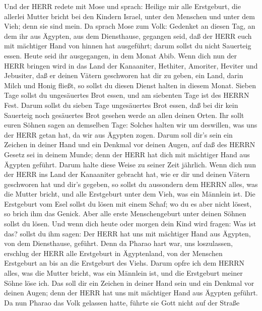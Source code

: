  Und der HERR redete mit Mose und sprach: 
Heilige mir alle Erstgeburt, die allerlei Mutter bricht bei den Kindern
Israel, unter den Menschen und unter dem Vieh; denn sie sind mein.
 Da sprach Mose zum Volk: Gedenket an diesen Tag, an dem ihr
aus Ägypten, aus dem Diensthause, gegangen seid, daß der HERR euch mit
mächtiger Hand von hinnen hat ausgeführt; darum sollst du nicht
Sauerteig essen.  Heute seid ihr ausgegangen, in dem Monat
Abib.  Wenn dich nun der HERR bringen wird in das Land der
Kanaaniter, Hethiter, Amoriter, Heviter und Jebusiter, daß er deinen
Vätern geschworen hat dir zu geben, ein Land, darin Milch und Honig
fließt, so sollst du diesen Dienst halten in diesem Monat. 
Sieben Tage sollst du ungesäuertes Brot essen, und am siebenten Tage ist
des HERRN Fest.  Darum sollst du sieben Tage ungesäuertes
Brot essen, daß bei dir kein Sauerteig noch gesäuertes Brot gesehen
werde an allen deinen Orten.  Ihr sollt euren Söhnen sagen
an demselben Tage: Solches halten wir um deswillen, was uns der HERR
getan hat, da wir aus Ägypten zogen.  Darum soll dir's sein
ein Zeichen in deiner Hand und ein Denkmal vor deinen Augen, auf daß des
HERRN Gesetz sei in deinem Munde; denn der HERR hat dich mit mächtiger
Hand aus Ägypten geführt.  Darum halte diese Weise zu
seiner Zeit jährlich.  Wenn dich nun der HERR ins Land der
Kanaaniter gebracht hat, wie er dir und deinen Vätern geschworen hat und
dir's gegeben,  so sollst du aussondern dem HERRN alles,
was die Mutter bricht, und alle Erstgeburt unter dem Vieh, was ein
Männlein ist.  Die Erstgeburt vom Esel sollst du lösen mit
einem Schaf; wo du es aber nicht lösest, so brich ihm das Genick. Aber
alle erste Menschengeburt unter deinen Söhnen sollst du lösen.
 Und wenn dich heute oder morgen dein Kind wird fragen: Was
ist das? sollst du ihm sagen: Der HERR hat uns mit mächtiger Hand aus
Ägypten, von dem Diensthause, geführt.  Denn da Pharao hart
war, uns loszulassen, erschlug der HERR alle Erstgeburt in Ägyptenland,
von der Menschen Erstgeburt an bis an die Erstgeburt des Viehs. Darum
opfre ich dem HERRN alles, was die Mutter bricht, was ein Männlein ist,
und die Erstgeburt meiner Söhne löse ich.  Das soll dir ein
Zeichen in deiner Hand sein und ein Denkmal vor deinen Augen; denn der
HERR hat uns mit mächtiger Hand aus Ägypten geführt.  Da
nun Pharao das Volk gelassen hatte, führte sie Gott nicht auf der Straße
